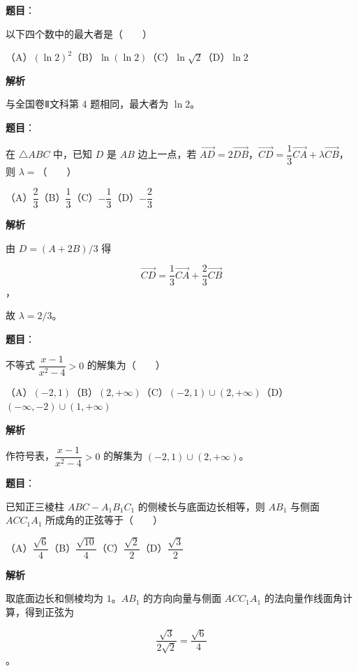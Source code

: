 \begin{answer}

\textbf{题目}：

以下四个数中的最大者是\mbox{（　　）}

（A）$(\ln2)^2$\quad（B）$\ln(\ln2)$\quad（C）$\ln\sqrt2$\quad（D）$\ln2$

\textbf{解析}

与全国卷Ⅱ文科第 4 题相同，最大者为 $\ln2$。


\end{answer}
\begin{answer}

\textbf{题目}：

在 $\triangle ABC$ 中，已知 $D$ 是 $AB$ 边上一点，若 $\overrightarrow{AD}=2\overrightarrow{DB}$，$\overrightarrow{CD}=\dfrac13\overrightarrow{CA}+\lambda\overrightarrow{CB}$，则 $\lambda=$\mbox{（　　）}

（A）$\dfrac23$\quad（B）$\dfrac13$\quad（C）$-\dfrac13$\quad（D）$-\dfrac23$

\textbf{解析}

由 $D=(A+2B)/3$ 得

\nopagebreak[4]
\[
\overrightarrow{CD}=\frac13\overrightarrow{CA}+\frac23\overrightarrow{CB}
\]
，

故 $\lambda=2/3$。


\end{answer}
\begin{answer}

\textbf{题目}：

不等式 $\dfrac{x-1}{x^2-4}>0$ 的解集为\mbox{（　　）}

（A）$(-2,1)$\quad（B）$(2,+\infty)$\quad（C）$(-2,1)\cup(2,+\infty)$\quad（D）$(-\infty,-2)\cup(1,+\infty)$

\textbf{解析}

作符号表，$\dfrac{x-1}{x^2-4}>0$ 的解集为 $(-2,1)\cup(2,+\infty)$。


\end{answer}
\begin{answer}

\textbf{题目}：

已知正三棱柱 $ABC-A_1B_1C_1$ 的侧棱长与底面边长相等，则 $AB_1$ 与侧面 $ACC_1A_1$ 所成角的正弦等于\mbox{（　　）}

（A）$\dfrac{\sqrt6}{4}$\quad（B）$\dfrac{\sqrt{10}}4$\quad（C）$\dfrac{\sqrt2}2$\quad（D）$\dfrac{\sqrt3}2$

\textbf{解析}

取底面边长和侧棱均为 $1$。$AB_1$ 的方向向量与侧面 $ACC_1A_1$ 的法向量作线面角计算，得到正弦为

\nopagebreak[4]
\[
\frac{\sqrt3}{2\sqrt2}=\frac{\sqrt6}{4}
\]
。


\end{answer}
